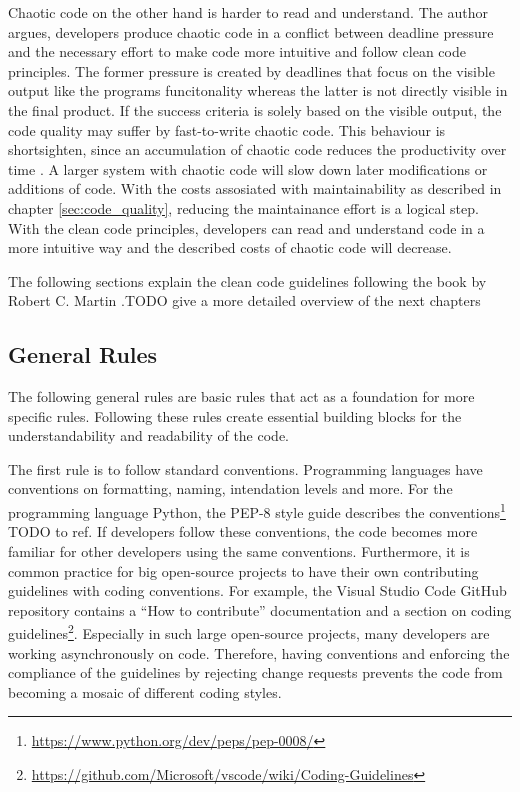 Chaotic code on the other hand is harder to read and understand. The author argues, developers produce chaotic code in a conflict between deadline pressure and the necessary effort to make code more intuitive and follow clean code principles\cite{martin_clean_2009}. The former pressure is created by deadlines that focus on the visible output like the programs funcitonality whereas the latter is not directly visible in the final product. If the success criteria is solely based on the visible output, the code quality may suffer by fast-to-write chaotic code. This behaviour is shortsighten, since an accumulation of chaotic code reduces the productivity over time . A larger system with chaotic code will slow down later modifications or additions of code. With the costs assosiated with maintainability as described in chapter \ref{sec:code_quality}, reducing the maintainance effort is a logical step. With the clean code principles, developers can read and understand code in a more intuitive way and the described costs of chaotic code will decrease\cite{martin_clean_2009}.



The following sections explain the clean code guidelines following the book by Robert C. Martin \cite{martin_clean_2009}.TODO give a more detailed overview of the next chapters

\subsection{General Rules}
The following general rules are basic rules that act as a foundation for more specific rules.
Following these rules create essential building blocks for the understandability and readability of the code. 

The first rule is to follow standard conventions. Programming languages have conventions on formatting, naming, intendation levels and more. For the programming language Python, the PEP-8 style guide describes the conventions\footnote{\url{https://www.python.org/dev/peps/pep-0008/}} TODO to ref. If developers follow these conventions, the code becomes more familiar for other developers using the same conventions. Furthermore, it is common practice for big open-source projects to have their own contributing guidelines with coding conventions. For example, the Visual Studio Code GitHub repository contains a \enquote{How to contribute} documentation and a section on coding guidelines\footnote{\url{https://github.com/Microsoft/vscode/wiki/Coding-Guidelines}}.  Especially in such large open-source projects, many developers are working asynchronously on code. Therefore, having conventions and enforcing the compliance of the guidelines by rejecting change requests prevents the code from becoming a mosaic of different coding styles.

